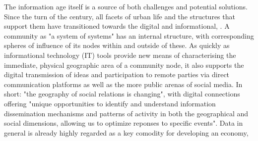 The information age itself is a source of both challenges and potential solutions. 
Since the turn of the century, all facets of urban life and the structures that support them have transitioned towards the digital and informational, .%
A community as "a system of systems"\cite{Roche2012} %
has an internal structure\cite{MasseyD1991}, %
with corresponding spheres of influence of its nodes within and outside of these.  
As quickly as informational technology (IT) tools provide new means of characterising the immediate, physical geographic area of a community node, it also supports the digital transmission of ideas and participation to remote parties via direct communication platforms as well as the more public arenas of social media. In short: "the geography of social relations is changing"\cite{MasseyD1991}, %
with digital connections offering  "unique opportunities to identify and understand information dissemination mechanisms and patterns of activity in both the geographical and social dimensions, allowing us to optimize reponses to specific events"\cite{Oliveira2021}.%
Data in general is already highly regarded as a key comodity for developing an economy\cite{Lupi2017}, %
